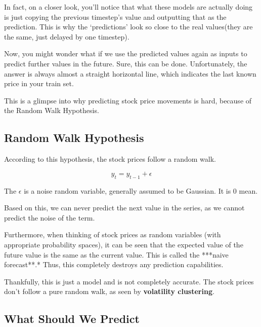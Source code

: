 In fact, on a closer look, you’ll notice that what these models are actually doing is just copying the previous timestep’s value and outputting that as the prediction. This is why the ‘predictions’ look so close to the real values(they are the same, just delayed by one timestep).

Now, you might wonder what if we use the predicted values again as inputs to predict further values in the future. Sure, this can be done. Unfortunately, the answer is always almost a straight horizontal line, which indicates the last known price in your train set.

This is a glimpse into why predicting stock price movements is hard, because of the Random Walk Hypothesis.

\subsection{Random Walk Hypothesis}

According to this hypothesis, the stock prices follow a random walk. 

\[y_t = y_{t-1} + \epsilon\]

The $\epsilon$ is a noise random variable, generally assumed to be Gaussian. It is 0 mean.

Based on this, we can never predict the next value in the series, as we cannot predict the noise of the term.

Furthermore, when thinking of stock prices as random variables (with appropriate probability spaces), it can be seen that the expected value of the future value is the same as the current value. This is called the ***naive forecast**.* Thus, this completely destroys any prediction capabilities.

Thankfully, this is just a model and is not completely accurate. The stock prices don’t follow a pure random walk, as seen by \textbf{volatility clustering}.


\subsection{What Should We Predict}

